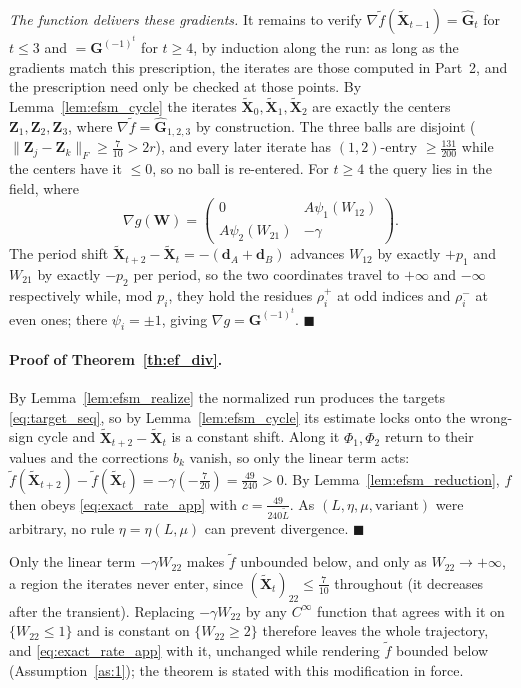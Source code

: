 \emph{The function delivers these gradients.} It remains to verify
$\nabla\tilde f(\tilde{\mathbf X}_{t-1})=\hat{\mathbf G}_t$ for $t\le3$ and
$=\mathbf G^{(-1)^t}$ for $t\ge4$, by induction along the run: as long as the
gradients match this prescription, the iterates are those computed in
Part~2, and the prescription need only be checked at those points. By
Lemma~\ref{lem:efsm_cycle} the iterates
$\tilde{\mathbf X}_0,\tilde{\mathbf X}_1,\tilde{\mathbf X}_2$ are exactly the
centers $\mathbf Z_1,\mathbf Z_2,\mathbf Z_3$, where
$\nabla\tilde f=\hat{\mathbf G}_{1,2,3}$ by construction. The three balls are
disjoint ($\|\mathbf Z_j-\mathbf Z_k\|_F\ge\tfrac7{10}>2r$), and every later
iterate has $(1,2)$-entry $\ge\tfrac{131}{200}$ while the centers have it
$\le0$, so no ball is re-entered. For $t\ge4$ the query lies in the field,
where
\[
\nabla g(\mathbf W)=\begin{pmatrix}0 & A\psi_1(W_{12})\\ A\psi_2(W_{21}) & -\gamma\end{pmatrix}.
\]
The period shift $\tilde{\mathbf X}_{t+2}-\tilde{\mathbf X}_t
=-(\mathbf d_A+\mathbf d_B)$ advances $W_{12}$ by exactly $+p_1$ and $W_{21}$
by exactly $-p_2$ per period, so the two coordinates travel to $+\infty$ and
$-\infty$ respectively while, mod $p_i$, they hold the residues $\rho_i^{+}$
at odd indices and $\rho_i^{-}$ at even ones; there $\psi_i=\pm1$, giving
$\nabla g=\mathbf G^{(-1)^t}$. $\blacksquare$

\paragraph{Proof of Theorem~\ref{th:ef_div}.}
By Lemma~\ref{lem:efsm_realize} the normalized run produces the targets
\eqref{eq:target_seq}, so by Lemma~\ref{lem:efsm_cycle} its estimate locks onto
the wrong-sign cycle and $\tilde{\mathbf X}_{t+2}-\tilde{\mathbf X}_t$ is a
constant shift. Along it $\Phi_1,\Phi_2$ return to their values and the
corrections $b_k$ vanish, so only the linear term acts:
$\tilde f(\tilde{\mathbf X}_{t+2})-\tilde f(\tilde{\mathbf X}_t)
=-\gamma(-\tfrac7{20})=\tfrac{49}{240}>0$. By Lemma~\ref{lem:efsm_reduction},
$f$ then obeys \eqref{eq:exact_rate_app} with $c=\tfrac{49}{240\tilde L}$. As
$(L,\eta,\mu,\text{variant})$ were arbitrary, no rule $\eta=\eta(L,\mu)$ can
prevent divergence. $\blacksquare$

\begin{remark}\label{rem:efsm_bdd}
Only the linear term $-\gamma W_{22}$ makes $\tilde f$ unbounded below, and only
as $W_{22}\to+\infty$, a region the iterates never enter, since
$(\tilde{\mathbf X}_t)_{22}\le\tfrac7{10}$ throughout (it decreases after the
transient). Replacing $-\gamma W_{22}$ by any $C^\infty$ function that agrees
with it on $\{W_{22}\le1\}$ and is constant on $\{W_{22}\ge2\}$ therefore leaves
the whole trajectory, and \eqref{eq:exact_rate_app} with it, unchanged while rendering
$\tilde f$ bounded below (Assumption~\ref{as:1}); the theorem is stated with
this modification in force.
\end{remark}


